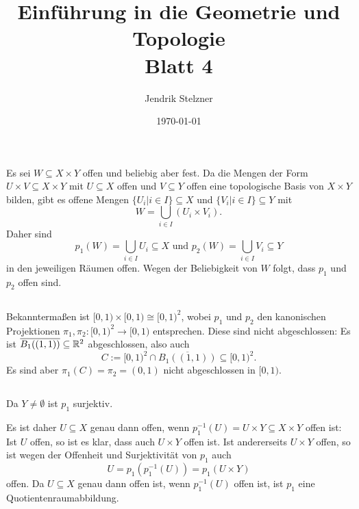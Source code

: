 \documentclass[a4paper,10pt]{article}
\title{\sc Einführung in die Geometrie und Topologie \\ \Large Blatt 4}
\author{Jendrik Stelzner}
\date{\today}
\begin{document}
\maketitle





\section{}


\subsection{}
Es sei $W \subseteq X \times Y$ offen und beliebig aber fest. Da die Mengen der Form $U \times V \subseteq X \times Y$ mit $U \subseteq X$ offen und $V \subseteq Y$ offen eine topologische Basis von $X \times Y$ bilden, gibt es offene Mengen  $\{U_i | i \in I\} \subseteq X$ und $\{V_i | i \in I\} \subseteq Y$ mit
\[
 W = \bigcup_{i \in I} (U_i \times V_i).
\]
Daher sind
\[
 p_1(W) = \bigcup_{i \in I} U_i \subseteq X \text{ und } p_2(W) = \bigcup_{i \in I} V_i \subseteq Y
\]
in den jeweiligen Räumen offen. Wegen der Beliebigkeit von $W$ folgt, dass $p_1$ und $p_2$ offen sind.


\subsection{}
Bekanntermaßen ist $[0,1) \times [0,1) \cong [0,1)^2$, wobei $p_1$ und $p_2$ den kanonischen Projektionen $\pi_1, \pi_2 : [0,1)^2 \to [0,1)$ entsprechen. Diese sind nicht abgeschlossen: Es ist $\overline{B_1((1,1))} \subseteq \mathbb{R}^2$ abgeschlossen, also auch
\[
 C := [0,1)^2 \cap \overline{B_1((1,1))} \subseteq [0,1)^2.
\]
Es sind aber $\pi_1(C) = \pi_2 = (0,1)$ nicht abgeschlossen in $[0,1)$.


\subsection{}
Da $Y \neq \emptyset$ ist $p_1$ surjektiv.

Es ist daher $U \subseteq X$ genau dann offen, wenn $p_1^{-1}(U) = U \times Y \subseteq X \times Y$ offen ist: Ist $U$ offen, so ist es klar, dass auch $U \times Y$ offen ist. Ist andererseits $U \times Y$ offen, so ist wegen der Offenheit und Surjektivität von $p_1$ auch
\[
 U = p_1(p_1^{-1}(U)) = p_1(U \times Y)
\]
offen.
Da $U \subseteq X$ genau dann offen ist, wenn $p_1^{-1}(U)$ offen ist, ist $p_1$ eine Quotientenraumabbildung.
\end{document}
